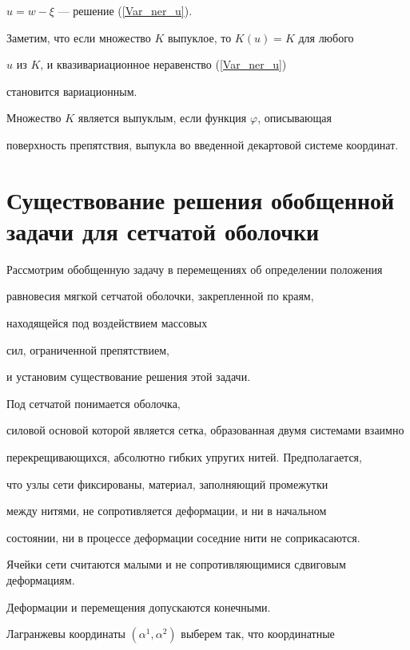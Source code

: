 $u=w-\xi$ --- решение (\ref{Var_ner_u}).





Заметим, что если множество $K$ выпуклое, то $K(u)=K$ для любого


$u$ из $K$, и квазивариационное неравенство (\ref{Var_ner_u})


становится вариационным.


Множество $K$ является выпуклым, если функция $\varphi$, описывающая


поверхность препятствия, выпукла во введенной декартовой системе координат. 





\section{Существование решения обобщенной задачи для сетчатой оболочки}





Рассмотрим обобщенную задачу в перемещениях об определении положения 


равновесия мягкой сетчатой оболочки, закрепленной по краям, 


находящейся под воздействием массовых 


сил, ограниченной препятствием,


и установим существование решения этой задачи.





Под сетчатой понимается оболочка, 


силовой основой которой является сетка, образованная двумя системами взаимно 


перекрещивающихся, абсолютно гибких упругих нитей. Предполагается,


что узлы сети фиксированы, материал, заполняющий промежутки 


между нитями, не сопротивляется деформации, и ни в начальном 


состоянии, ни в процессе деформации соседние нити не соприкасаются.


Ячейки сети считаются малыми и не сопротивляющимися сдвиговым деформациям.


Деформации и перемещения допускаются конечными.





Лагранжевы координаты $(\alpha^1,\alpha^2)$ выберем так, что координатные 


